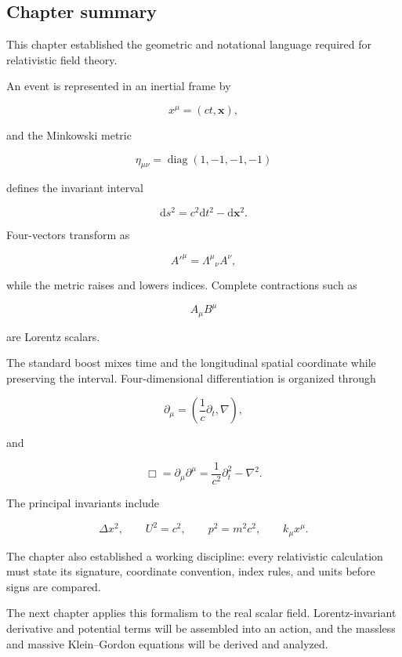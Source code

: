 \subsection{Chapter summary}

This chapter established the geometric and notational language required for relativistic field theory.

An event is represented in an inertial frame by

\[
x^{\mu}=(ct,\mathbf{x}),
\]

and the Minkowski metric

\[
\eta_{\mu\nu}
=
\operatorname{diag}(1,-1,-1,-1)
\]

defines the invariant interval

\[
\mathrm{d}s^{2}
=
c^{2}\mathrm{d}t^{2}
-
\mathrm{d}\mathbf{x}^{2}.
\]

Four-vectors transform as

\[
A'^{\mu}
=
\Lambda^{\mu}{}_{\nu}A^{\nu},
\]

while the metric raises and lowers indices. Complete contractions such as

\[
A_{\mu}B^{\mu}
\]

are Lorentz scalars.

The standard boost mixes time and the longitudinal spatial coordinate while preserving the interval. Four-dimensional differentiation is organized through

\[
\partial_{\mu}
=
\left(
\frac{1}{c}\partial_{t},
\nabla
\right),
\]

and

\[
\Box
=
\partial_{\mu}\partial^{\mu}
=
\frac{1}{c^{2}}\partial_{t}^{2}
-
\nabla^{2}.
\]

The principal invariants include

\[
\Delta x^{2},
\qquad
U^{2}=c^{2},
\qquad
p^{2}=m^{2}c^{2},
\qquad
k_{\mu}x^{\mu}.
\]

The chapter also established a working discipline: every relativistic calculation must state its signature, coordinate convention, index rules, and units before signs are compared.

The next chapter applies this formalism to the real scalar field. Lorentz-invariant derivative and potential terms will be assembled into an action, and the massless and massive Klein--Gordon equations will be derived and analyzed.